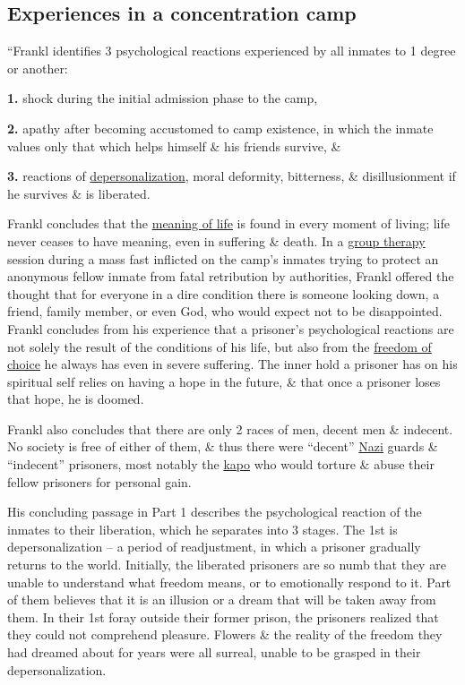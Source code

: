 \documentclass[oneside]{book}
\numberwithin{equation}{section}
\begin{document}
\subsection{Experiences in a concentration camp}
``Frankl identifies 3 psychological reactions experienced by all inmates to 1 degree or another:
\begin{enumerate*}
	\item[\textbf{1.}] shock during the initial admission phase to the camp,
	\item[\textbf{2.}] apathy after becoming accustomed to camp existence, in which the inmate values only that which helps himself \& his friends survive, \&
	\item[\textbf{3.}] reactions of \href{https://en.wikipedia.org/wiki/Depersonalization}{depersonalization}, moral deformity, bitterness, \& disillusionment if he survives \& is liberated.
\end{enumerate*}
Frankl concludes that the \href{https://en.wikipedia.org/wiki/Meaning_of_life}{meaning of life} is found in every moment of living; life never ceases to have meaning, even in suffering \& death. In a \href{https://en.wikipedia.org/wiki/Group_therapy}{group therapy} session during a mass fast inflicted on the camp's inmates trying to protect an anonymous fellow inmate from fatal retribution by authorities, Frankl offered the thought that for everyone in a dire condition there is someone looking down, a friend, family member, or even God, who would expect not to be disappointed. Frankl concludes from his experience that a prisoner's psychological reactions are not solely the result of the conditions of his life, but also from the \href{https://en.wikipedia.org/wiki/Freedom_of_choice}{freedom of choice} he always has even in severe suffering. The inner hold a prisoner has on his spiritual self relies on having a hope in the future, \& that once a prisoner loses that hope, he is doomed.

Frankl also concludes that there are only 2 races of men, decent men \& indecent. No society is free of either of them, \& thus there were ``decent'' \href{https://en.wikipedia.org/wiki/Nazi}{Nazi} guards \& ``indecent'' prisoners, most notably the \href{https://en.wikipedia.org/wiki/Kapo_(concentration_camp)}{kapo} who would torture \& abuse their fellow prisoners for personal gain.

His concluding passage in Part 1 describes the psychological reaction of the inmates to their liberation, which he separates into 3 stages. The 1st is depersonalization -- a period of readjustment, in which a prisoner gradually returns to the world. Initially, the liberated prisoners are so numb that they are unable to understand what freedom means, or to emotionally respond to it. Part of them believes that it is an illusion or a dream that will be taken away from them. In their 1st foray outside their former prison, the prisoners realized that they could not comprehend pleasure. Flowers \& the reality of the freedom they had dreamed about for years were all surreal, unable to be grasped in their depersonalization.
\end{document}
